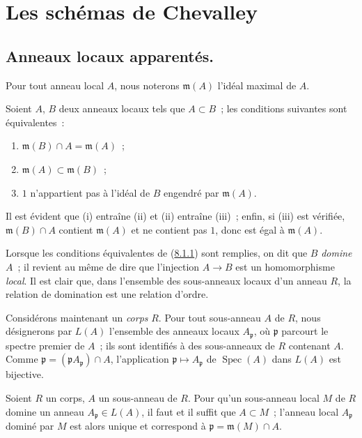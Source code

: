 \section{Les schémas de Chevalley}
\label{section:I.8-fr}

\subsection{Anneaux locaux apparentés.}
\label{subsection:I.8.1-fr}

Pour tout anneau local $A$, nous noterons $\mathfrak m(A)$ l'idéal maximal de
$A$.

\begin{lemma}[8.1.1]
\label{I.8.1.1-fr}
Soient $A$, $B$ deux anneaux locaux tels que $A\subset B$~; les conditions
suivantes sont équivalentes~:
\begin{enumerate}
  \item[(i)] $\mathfrak m(B)\cap A=\mathfrak m(A)$~;
  \item[(ii)] $\mathfrak m(A)\subset\mathfrak m(B)$~;
  \item[(iii)] $1$ n'appartient pas à l'idéal de $B$ engendré par
    $\mathfrak m(A)$.
\end{enumerate}
\end{lemma}

Il est évident que (i) entraîne (ii) et (ii) entraîne (iii)~; enfin, si (iii)
est vérifiée, $\mathfrak m(B)\cap A$ contient $\mathfrak m(A)$ et ne contient
pas $1$, donc est égal à $\mathfrak m(A)$.

Lorsque les conditions équivalentes de
(\hyperref[I.8.1.1-fr]{8.1.1}) sont remplies, on dit que $B$ \emph{domine}
$A$~; il revient au même de dire que l'injection $A\to B$ est un
homomorphisme \emph{local}. Il est clair que, dans l'ensemble des sous-anneaux
locaux d'un anneau $R$, la relation de domination est une relation d'ordre.

\begin{env}[8.1.2]
\label{I.8.1.2-fr}
Considérons maintenant un \emph{corps} $R$. Pour tout sous-anneau $A$ de $R$,
nous désignerons par $L(A)$ l'ensemble des anneaux locaux $A_\mathfrak p$, où
$\mathfrak p$ parcourt le spectre premier de $A$~; ils sont identifiés à des
sous-anneaux de $R$ contenant $A$. Comme
$\mathfrak p=(\mathfrak p A_\mathfrak p)\cap A$, l'application
$\mathfrak p\mapsto A_\mathfrak p$ de $\operatorname{Spec}(A)$ dans $L(A)$
est bijective.
\end{env}

\begin{lemma}[8.1.3]
\label{I.8.1.3-fr}
Soient $R$ un corps, $A$ un sous-anneau de $R$. Pour qu'un sous-anneau local
$M$ de $R$ domine un anneau $A_\mathfrak p\in L(A)$, il faut et il suffit que
$A\subset M$~; l'anneau local $A_\mathfrak p$ dominé par $M$ est alors unique
et correspond à $\mathfrak p=\mathfrak m(M)\cap A$.
\end{lemma}

